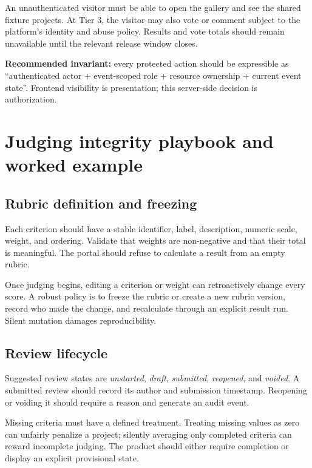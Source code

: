 An unauthenticated visitor must be able to open the gallery and see the shared fixture projects. At Tier 3, the visitor may also vote or comment subject to the platform's identity and abuse policy. Results and vote totals should remain unavailable until the relevant release window closes.

\begin{keybox}
\textbf{Recommended invariant:} every protected action should be expressible as ``authenticated actor + event-scoped role + resource ownership + current event state''. Frontend visibility is presentation; this server-side decision is authorization.
\end{keybox}

\section{Judging integrity playbook and worked example}

\advisory\par


\subsection{Rubric definition and freezing}

Each criterion should have a stable identifier, label, description, numeric scale, weight, and ordering. Validate that weights are non-negative and that their total is meaningful. The portal should refuse to calculate a result from an empty rubric.

Once judging begins, editing a criterion or weight can retroactively change every score. A robust policy is to freeze the rubric or create a new rubric version, record who made the change, and recalculate through an explicit result run. Silent mutation damages reproducibility.

\subsection{Review lifecycle}

Suggested review states are \emph{unstarted}, \emph{draft}, \emph{submitted}, \emph{reopened}, and \emph{voided}. A submitted review should record its author and submission timestamp. Reopening or voiding it should require a reason and generate an audit event.

Missing criteria must have a defined treatment. Treating missing values as zero can unfairly penalize a project; silently averaging only completed criteria can reward incomplete judging. The product should either require completion or display an explicit provisional state.

